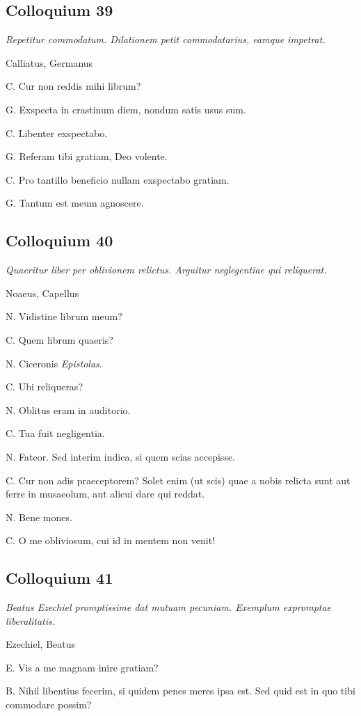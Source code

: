 \documentclass{article}
\begin{document}
\subsection{Colloquium 39}
\emph{Repetitur commodatum. Dilationem petit commodatarius, eamque impetrat.}

Calliatus, Germanus

C. Cur non reddis mihi librum?

G. Exspecta in crastinum diem, nondum satis usus sum.

C. Libenter exspectabo.

G. Referam tibi gratiam, Deo volente.

C. Pro tantillo beneficio nullam exspectabo gratiam.

G. Tantum est meum agnoscere.

\subsection{Colloquium 40}
\emph{Quaeritur liber per oblivionem relictus. Arguitur neglegentiae qui reliquerat.}

Noaeus, Capellus

N. Vidistine librum meum?

C. Quem librum quaeris?

N. Ciceronis \emph{Epistolas}.

C. Ubi reliqueras?

N. Oblitus eram in auditorio.

C. Tua fuit negligentia.

N. Fateor. Sed interim indica, si quem scias accepisse.

C. Cur non adis praeceptorem? Solet enim (ut scis) quae a nobis relicta sunt aut ferre in musaeolum, aut alicui dare qui reddat.

N. Bene mones.

C. O me obliviosum, cui id in mentem non venit!

\subsection{Colloquium 41}
\emph{Beatus Ezechiel promptissime dat mutuam pecuniam. Exemplum expromptae liberalitatis.}

Ezechiel, Beatus

E. Vis a me magnam inire gratiam?

B. Nihil libentius fecerim, si quidem penes meres ipsa est. Sed quid est in quo tibi commodare possim?
\end{document}
